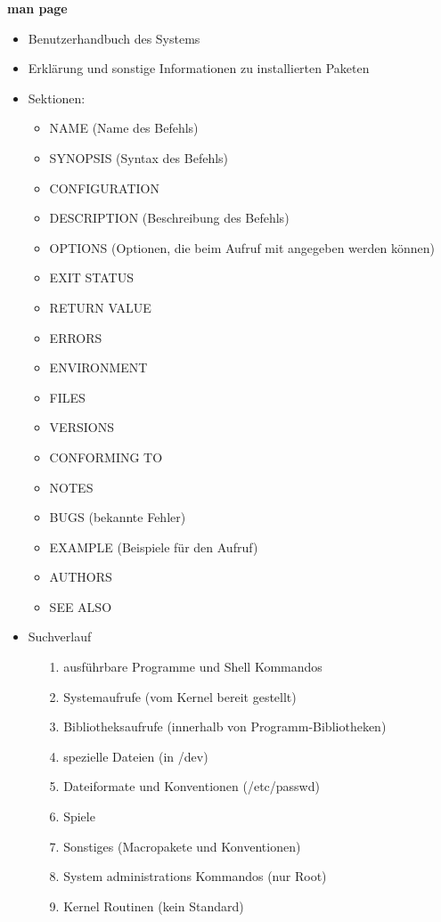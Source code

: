 \documentclass{article}
\begin{document}
\textbf{man page}
\begin{itemize}
	\item Benutzerhandbuch des Systems
	\item Erklärung und sonstige Informationen zu installierten Paketen
	\item Sektionen:
	\begin{itemize}
		\item NAME (Name des Befehls)
		\item SYNOPSIS (Syntax des Befehls)
		\item CONFIGURATION
		\item DESCRIPTION (Beschreibung des Befehls)
		\item OPTIONS (Optionen, die beim Aufruf mit angegeben werden können)
		\item EXIT STATUS
		\item RETURN VALUE
		\item ERRORS
		\item ENVIRONMENT
		\item FILES
		\item VERSIONS
		\item CONFORMING TO
		\item NOTES
		\item BUGS (bekannte Fehler)
		\item EXAMPLE (Beispiele für den Aufruf)
		\item AUTHORS
		\item SEE ALSO
	\end{itemize}
	\item Suchverlauf
	\begin{itemize}
		\item[1.] ausführbare Programme und Shell Kommandos
        \item[2.] Systemaufrufe (vom Kernel bereit gestellt)
        \item[3.] Bibliotheksaufrufe (innerhalb von Programm-Bibliotheken)
        \item[4.] spezielle Dateien (in /dev)
        \item[5.] Dateiformate und Konventionen (/etc/passwd)
        \item[6.] Spiele
        \item[7.] Sonstiges (Macropakete und Konventionen)
        \item[8.] System administrations Kommandos (nur Root)
        \item[9.] Kernel Routinen (kein Standard)
	\end{itemize}
\end{itemize}
\end{document}

